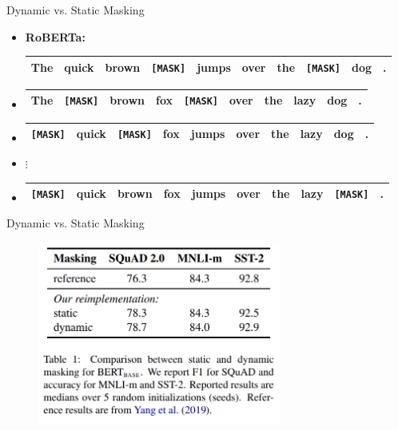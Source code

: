 \begin{frame}{Dynamic vs. Static Masking}
\begin{itemize}
	\item \normalsize \textbf{RoBERTa:}
			\footnotesize
\begin{tabular}{|cccccccccc|}
\hline
The & quick & brown & \cellcolor{blue!65}\texttt{[MASK]} & jumps & over & the & \cellcolor{blue!65}\texttt{[MASK]} & dog & . \\
\hline
\end{tabular}
	\item[] \footnotesize
\begin{tabular}{|cccccccccc|}
\hline
The & \cellcolor{blue!65}\texttt{[MASK]} & brown & fox & \cellcolor{blue!65}\texttt{[MASK]} & over & the & lazy & dog & . \\
\hline
\end{tabular}
	\item[] \footnotesize
\begin{tabular}{|cccccccccc|}
\hline
\cellcolor{blue!65}\texttt{[MASK]} & quick & \cellcolor{blue!65}\texttt{[MASK]} & fox & jumps & over & the & lazy & dog & . \\
\hline
\end{tabular}
	\item[] \begin{center}$\vdots$\end{center}
	\item[] \footnotesize
\begin{tabular}{|cccccccccc|}
\hline
\cellcolor{blue!65}\texttt{[MASK]} & quick & brown & fox & jumps & over & the & lazy & \cellcolor{blue!65}\texttt{[MASK]} & . \\
\hline
\end{tabular}
\end{itemize}

\vfill

\end{frame}


\begin{frame}{Dynamic vs. Static Masking}

\vfill

\begin{figure}
\centering
\includegraphics[width = 8cm]{figure/52-roberta-dynamic.png}\\ 
\end{figure}

\vfill

\end{frame}

